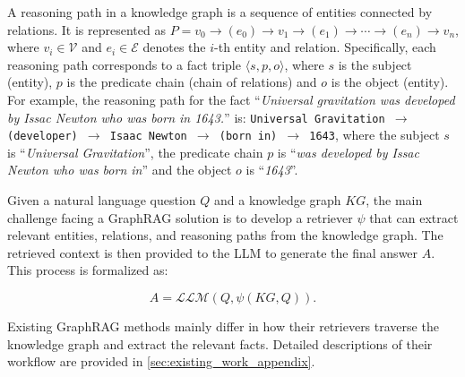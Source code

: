  A reasoning path in a knowledge graph is a sequence of entities connected by relations. It is represented as $P = v_0 \rightarrow (e_0) \rightarrow v_1 \rightarrow (e_1) \rightarrow \cdots \rightarrow (e_n) \rightarrow v_n$, where $v_i \in \mathcal{V}$ and $e_i \in \mathcal{E}$ denotes the $i$-th entity and relation. Specifically, each reasoning path corresponds to a fact triple $\langle s,p,o \rangle$, where $s$ is the subject (entity), $p$ is the predicate chain (chain of relations) and $o$ is the object (entity). For example, the reasoning path for the fact ``\textit{Universal gravitation was developed by Issac Newton who was born in 1643.}'' is: \texttt{Universal Gravitation $\rightarrow$ (developer) $\rightarrow$ Isaac Newton $\rightarrow$ (born in) $\rightarrow$ 1643}, where the subject $s$ is ``\textit{Universal Gravitation}'', the predicate chain $p$ is ``\textit{was developed by Issac Newton who was born in}'' and the object $o$ is ``\textit{1643}''.

 Given a natural language question $Q$ and a knowledge graph $KG$, the main challenge facing a GraphRAG solution is to develop a retriever $\psi$ that can extract relevant entities, relations, and reasoning paths from the knowledge graph. The retrieved context is then provided to the LLM to generate the final answer $A$. This process is formalized as:

\begin{equation}\label{equ:graphrag}
A = \mathcal{LLM}(Q, \psi(KG, Q)).
\end{equation}

Existing GraphRAG methods mainly differ in how their retrievers traverse the knowledge graph and extract the relevant facts. Detailed descriptions of their workflow are provided in \autoref{sec:existing_work_appendix}.




